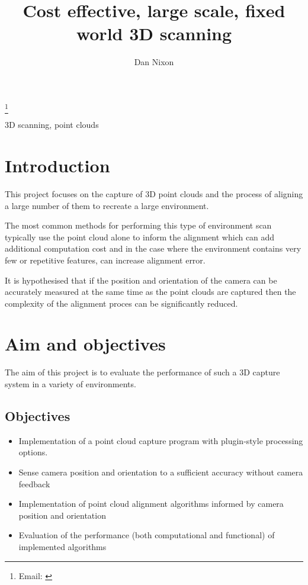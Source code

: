 \documentclass{entcs}
\begin{document}
\begin{frontmatter}
  \title{Cost effective, large scale, fixed world 3D scanning}
  \author{Dan Nixon}
  \address{School of Computing Science, Newcastle University, UK}
  \thanks[email]{Email:
    \href{mailto:d.nixon2@ncl.ac.uk}
         {\texttt{}}}


  \begin{keyword}
    3D scanning, point clouds
  \end{keyword}
\end{frontmatter}

\section{Introduction}
\label{sec:introduction}

This project focuses on the capture of 3D point clouds and the process of
aligning a large number of them to recreate a large environment.

The most common methods for performing this type of environment scan typically
use the point cloud alone to inform the alignment which can add additional
computation cost and in the case where the environment contains very few or
repetitive features, can increase alignment error.

It is hypothesised that if the position and orientation of the camera can be
accurately measured at the same time as the point clouds are captured then the
complexity of the alignment proces can be significantly reduced.

\section{Aim and objectives}
\label{sec:aim_and_objectives}

The aim of this project is to evaluate the performance of such a 3D capture
system in a variety of environments.

\subsection{Objectives}
\label{sec:objectives}

\begin{itemize}
  \item
    Implementation of a point cloud capture program with plugin-style processing
    options.

  \item
    Sense camera position and orientation to a sufficient accuracy without
    camera feedback

  \item
    Implementation of point cloud alignment algorithms informed by camera
    position and orientation

  \item
    Evaluation of the performance (both computational and functional) of
    implemented algorithms

\end{itemize}
\end{document}
